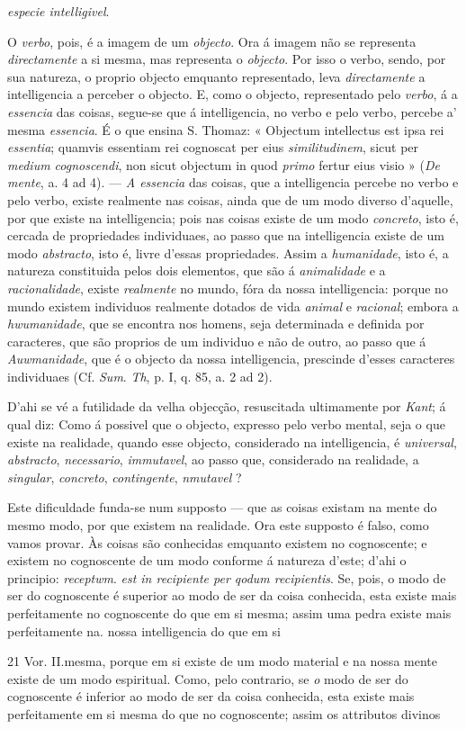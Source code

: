 \emph{especie intelligivel}.\par O \emph{verbo}, pois, é a imagem de um \emph{objecto}. Ora á imagem não se representa \emph{directamente} a si mesma, mas representa o \emph{objecto}. Por isso o verbo, sendo, por sua natureza, o proprio objecto emquanto representado, leva \emph{directamente} a intelligencia a perceber o objecto. E, como o objecto, representado pelo \emph{verbo}, á a \emph{essencia} das coisas, segue-se que á intelligencia, no verbo e pelo verbo, percebe a' mesma \emph{essencia}. É o que ensina S. Thomaz: « Objectum intellectus est ipsa rei \emph{essentia}; quamvis essentiam rei cognoscat per eius \emph{similitudinem}, sicut per \emph{medium cognoscendi}, non sicut objectum in quod \emph{primo} fertur eius visio » (\emph{De mente}, a. 4 ad 4). --- \emph{A essencia} das coisas, que a intelligencia percebe no verbo e pelo verbo, existe realmente nas coisas, ainda que de um modo diverso d'aquelle, por que existe na intelligencia; pois nas coisas existe de um modo \emph{concreto}, isto é, cercada de propriedades individuaes, ao passo que na intelligencia existe de um modo \emph{abstracto}, isto é, livre d'essas propriedades. Assim a \emph{humanidade}, isto é, a natureza constituida pelos dois elementos, que são á \emph{animalidade} e a \emph{racionalidade}, existe \emph{realmente} no mundo, fóra da nossa intelligencia: porque no mundo existem individuos realmente dotados de vida \emph{animal} e \emph{racional}; embora a \emph{hwumanidade}, que se encontra nos homens, seja determinada e definida por caracteres, que são proprios de um individuo e não de outro, ao passo que á \emph{Auwmanidade}, que é o objecto da nossa intelligencia, prescinde d'esses caracteres individuaes (Cf. \emph{Sum}. \emph{Th}, p. I, q. 85, a. 2 ad 2).\par D'ahi se vé a futilidade da velha objecção, resuscitada ultimamente por \emph{Kant}; á qual diz: Como á possivel que o objecto, expresso pelo verbo mental, seja o que existe na realidade, quando esse objecto, considerado na intelligencia, é \emph{universal}, \emph{abstracto}, \emph{necessario}, \emph{immutavel}, ao passo que, considerado na realidade, a \emph{singular}, \emph{concreto}, \emph{contingente}, \emph{nmutavel} ?\par Este dificuldade funda-se num supposto --- que as coisas existam na mente do mesmo modo, por que existem na realidade. Ora este supposto é falso, como vamos provar. Às coisas são conhecidas emquanto existem no cognoscente; e existem no cognoscente de um modo conforme á natureza d'este; d'ahi o principio: \emph{receptwm}. \emph{est in recipiente per qodum recipientis}. Se, pois, o modo de ser do cognoscente é superior ao modo de ser da coisa conhecida, esta existe mais perfeitamente no cognoscente do que em si mesma; assim uma pedra existe mais perfeitamente na. nossa intelligencia do que em si\par 21 Vor. II.mesma, porque em si existe de um modo material e na nossa mente existe de um modo espiritual. Como, pelo contrario, se \emph{o} modo de ser do cognoscente é inferior ao modo de ser da coisa conhecida, esta existe mais perfeitamente em si mesma do que no cognoscente; assim os attributos divinos 